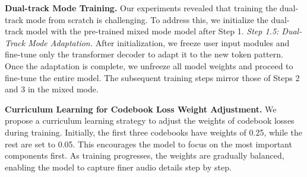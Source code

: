 

\textbf{Dual-track Mode Training. }
Our experiments revealed that training the dual-track mode from scratch is challenging. To address this, we initialize the dual-track model with the pre-trained mixed mode model after Step 1. \textit{Step 1.5: Dual-Track Mode Adaptation.} After initialization, we freeze user input modules and fine-tune only the transformer decoder to adapt it to the new token pattern. Once the adaptation is complete, we unfreeze all model weights and proceed to fine-tune the entire model. The subsequent training steps mirror those of Steps 2 and 3 in the mixed mode.

\textbf{Curriculum Learning for Codebook Loss Weight Adjustment. }
We propose a curriculum learning strategy to adjust the weights of codebook losses during training. Initially, the first three codebooks have weights of 0.25, while the rest are set to 0.05. 
 This encourages the model to focus on the most important components first. As training progresses, the weights are gradually balanced, enabling the model to capture finer audio details step by step.



